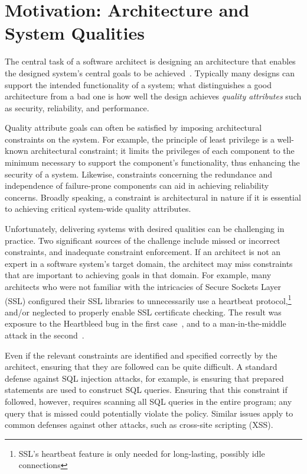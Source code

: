 \documentclass[runningheads]{llncs}
\begin{document}
\begin{sloppypar}
\section{Motivation: Architecture and System Qualities}

The central task of a software architect is designing an architecture that enables the designed system's central goals to be achieved~\cite{bass-software-architecture-in-practice}.  Typically many designs can support the intended functionality of a system; what distinguishes a good architecture from a bad one is how well the design achieves \emph{quality attributes} such as security, reliability, and performance.

Quality attribute goals can often be satisfied by imposing architectural constraints on the system.  For example, the principle of least privilege is a well-known architectural constraint; it limits the privileges of each component to the minimum necessary to support the component's functionality, thus enhancing the security of a system.  Likewise, constraints concerning the redundance and independence of failure-prone components can aid in achieving reliability concerns.  Broadly speaking, a constraint is architectural in nature if it is essential to achieving critical system-wide quality attributes.

Unfortunately, delivering systems with desired qualities can be challenging in practice.  Two significant sources of the challenge include missed or incorrect constraints, and inadequate constraint enforcement.  If an architect is not an expert in a software system's target domain, the architect may miss constraints that are important to achieving goals in that domain.  For example, many architects who were not familiar with the intricacies of Secure Sockets Layer (SSL) configured their SSL libraries to unnecessarily use a heartbeat protocol,\footnote{SSL's heartbeat feature is only needed for long-lasting, possibly idle connections} and/or neglected to properly enable SSL certificate checking.  The result was exposure to the Heartbleed bug in the first case~\cite{Heartbleed}, and to a man-in-the-middle attack in the second~\cite{most-dangerous-code-in-the-world}.

Even if the relevant constraints are identified and specified correctly by the architect, ensuring that they are followed can be quite difficult.  A standard defense against SQL injection attacks, for example, is ensuring that prepared statements are used to construct SQL queries.  Ensuring that this constraint if followed, however, requires scanning all SQL queries in the entire program; any query that is missed could potentially violate the policy.  Similar issues apply to common defenses against other attacks, such as cross-site scripting (XSS).



\end{sloppypar}
\end{document}
